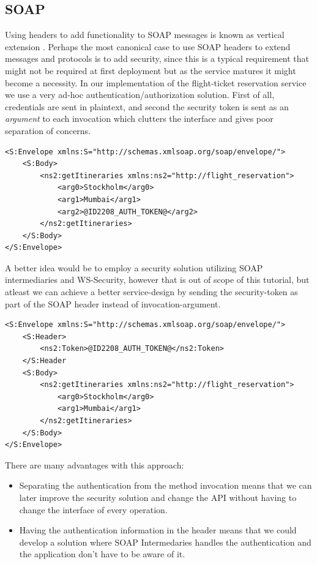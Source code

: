 \documentclass[a4paper, 11pt]{article}
\begin{document}
\subsection*{SOAP}
Using headers to add functionality to SOAP messages is known as vertical extension \citep{coursebook}. Perhaps the most canonical case to use SOAP headers to extend messages and protocols is to add security, since this is a typical requirement that might not be required at first deployment but as the service matures it might become a necessity. In our implementation of the flight-ticket reservation service we use a very ad-hoc authentication/authorization solution. First of all, credentials are sent in plaintext, and second the security token is sent as an \textit{argument} to each invocation which clutters the interface and gives poor separation of concerns.
\begin{lstlisting}[frame=single,style=base]
<S:Envelope xmlns:S="http://schemas.xmlsoap.org/soap/envelope/">
    <S:Body>
        <ns2:getItineraries xmlns:ns2="http://flight_reservation">
            <arg0>Stockholm</arg0>
            <arg1>Mumbai</arg1>
            <arg2>@ID2208_AUTH_TOKEN@</arg2>
        </ns2:getItineraries>
    </S:Body>
</S:Envelope>
\end{lstlisting}
A better idea would be to employ a security solution utilizing SOAP intermediaries and WS-Security, however that is out of scope of this tutorial, but atleast we can achieve a better service-design by sending the security-token as part of the SOAP header instead of invocation-argument.
\begin{lstlisting}[frame=single,style=base]
<S:Envelope xmlns:S="http://schemas.xmlsoap.org/soap/envelope/">
    <S:Header>
        <ns2:Token>@ID2208_AUTH_TOKEN@</ns2:Token>
    </S:Header
    <S:Body>
        <ns2:getItineraries xmlns:ns2="http://flight_reservation">
            <arg0>Stockholm</arg0>
            <arg1>Mumbai</arg1>
        </ns2:getItineraries>
    </S:Body>
</S:Envelope>
\end{lstlisting}
There are many advantages with this approach:
\begin{itemize}
\item Separating the authentication from the method invocation means that we can later improve the security solution and change the API without having to change the interface of every operation.
\item Having the authentication information in the header means that we could develop a solution where SOAP Intermedaries handles the authentication and the application don't have to be aware of it.
\end{itemize}
\end{document}
